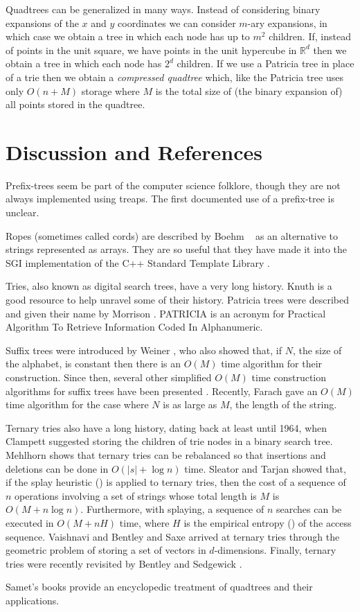 Quadtrees can be generalized in many ways.  Instead of considering
binary expansions of the $x$ and $y$ coordinates we can consider
$m$-ary expansions, in which case we obtain a tree in which each node
has up to $m^2$ children.  If, instead of points in the unit square,
we have points in the unit hypercube in $\mathbb{R}^d$ then we obtain
a tree in which each node has $2^d$ children.  If we use a Patricia
tree in place of a trie then we obtain a \emph{compressed quadtree}
which, like the Patricia tree uses only $O(n+M)$ storage where $M$ is
the total size of (the binary expansion of) all points stored in the
quadtree.  

\section{Discussion and References}

Prefix-trees seem be part of the computer science folklore, though
they are not always implemented using treaps. The first documented use
of a prefix-tree is unclear.

Ropes (sometimes called cords) are described by Boehm \etal\ \cite{bap95}
as an alternative to strings represented as arrays.  They are so useful
that they have made it into the SGI implementation of the C++ Standard
Template Library \cite{x}.

Tries, also known as digital search trees, have a very long history.
Knuth \cite{k73c} is a good resource to help unravel some of their
history.  Patricia trees were described and given their name by
Morrison \cite{m68}.  PATRICIA is an acronym for Practical Algorithm
To Retrieve Information Coded In Alphanumeric.

Suffix trees were introduced by Weiner \cite{w73}, who also showed
that, if $N$, the size of the alphabet, is constant then there is an
$O(M)$ time algorithm for their construction.  Since then, several
other simplified $O(M)$ time construction algorithms for suffix trees
have been presented \cite{cs85,m76}.  Recently, Farach \cite{f97} gave
an $O(M)$ time algorithm for the case where $N$ is as large as $M$,
the length of the string.

Ternary tries also have a long history, dating back at least until
1964, when Clampett \cite{c64} suggested storing the children of trie
nodes in a binary search tree.  Mehlhorn \cite{m79} shows that ternary
tries can be rebalanced so that insertions and deletions can be done
in $O(|s|+\log n)$ time.  Sleator and Tarjan \cite{st85} showed that,
if the splay heuristic () is applied to ternary
tries, then the cost of a sequence of $n$ operations involving a set
of strings whose total length is $M$ is $O(M+n\log n)$.  Furthermore,
with splaying, a sequence of $n$ searches can be executed in $O(M+
nH)$ time, where $H$ is the empirical entropy () of
the access sequence.  Vaishnavi \cite{v84} and Bentley and Saxe
\cite{bs79} arrived at ternary tries through the geometric problem of
storing a set of vectors in $d$-dimensions.  Finally, ternary tries
were recently revisited by Bentley and Sedgewick \cite{bs97}.

Samet's books \cite{s90,sXX,sYY} provide an encyclopedic treatment of
quadtrees and their applications.


